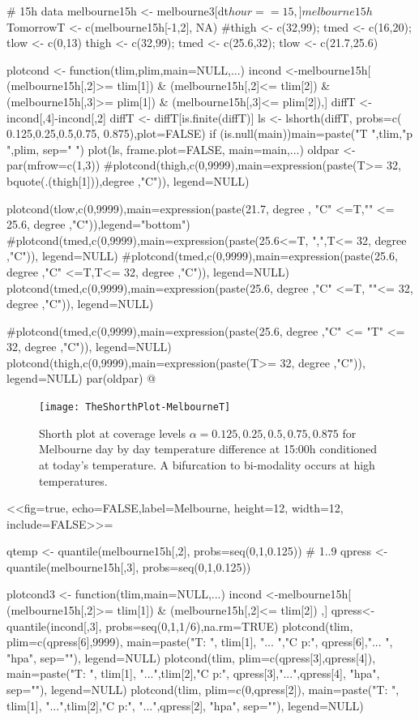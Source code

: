 \documentclass[dvips,12pt,a4paper,twoside]{amsart}
\begin{document}
# 15h data
melbourne15h <- melbourne3[dt$hour==15,]
melbourne15h$TomorrowT <- c(melbourne15h[-1,2], NA)
#thigh <- c(32,99); tmed <- c(16,20); tlow <- c(0,13)
thigh <- c(32,99); tmed <- c(25.6,32); tlow <- c(21.7,25.6)

plotcond <- function(tlim,plim,main=NULL,...){
	incond <-melbourne15h[
	(melbourne15h[,2]>= tlim[1]) 	&
	(melbourne15h[,2]<= tlim[2]) 	& 
	(melbourne15h[,3]>= plim[1]) &
	(melbourne15h[,3]<= plim[2]),]
	diffT <- incond[,4]-incond[,2]
	diffT <- diffT[is.finite(diffT)]
	ls <- lshorth(diffT, probs=c( 0.125,0.25,0.5,0.75, 	0.875),plot=FALSE)
	if (is.null(main)){main=paste("T ",tlim,"p ",plim, sep=" ")}
	plot(ls, frame.plot=FALSE, main=main,...)
	}
oldpar <- par(mfrow=c(1,3))
#plotcond(thigh,c(0,9999),main=expression(paste(T>= 32,  bquote(.(thigh[1])),degree ,"C")), legend=NULL)

plotcond(tlow,c(0,9999),main=expression(paste(21.7, degree , "C" <=T,"" <= 25.6,  degree ,"C")),legend="bottom")
#plotcond(tmed,c(0,9999),main=expression(paste(25.6<=T, ",",T<= 32,  degree ,"C")), legend=NULL)
#plotcond(tmed,c(0,9999),main=expression(paste(25.6,  degree ,"C" <=T,T<= 32,  degree ,"C")), legend=NULL)
plotcond(tmed,c(0,9999),main=expression(paste(25.6,  degree ,"C" <=T, ""<= 32,  degree ,"C")), legend=NULL)

#plotcond(tmed,c(0,9999),main=expression(paste(25.6,  degree ,"C" <= "T" <= 32,  degree ,"C")), legend=NULL)
plotcond(thigh,c(0,9999),main=expression(paste(T>= 32,  degree ,"C")), legend=NULL)
par(oldpar)
@
\begin{figure}[htb]
\texttt{[image: TheShorthPlot-MelbourneT]}
\caption{Shorth plot at coverage levels $\alpha =0.125,0.25,0.5,0.75,  0.875$ for Melbourne day by day temperature difference at 15:00h conditioned at today's temperature. 
A bifurcation to bi-modality occurs at high temperatures.}\label{fig:melbournet}\end{figure}

<<fig=true, echo=FALSE,label=Melbourne, height=12, width=12, include=FALSE>>=

qtemp <- quantile(melbourne15h[,2], probs=seq(0,1,0.125)) # 1..9
qpress <- quantile(melbourne15h[,3], probs=seq(0,1,0.125))

plotcond3 <- function(tlim,main=NULL,...){
	incond <-melbourne15h[
	(melbourne15h[,2]>= tlim[1]) 	&
	(melbourne15h[,2]<= tlim[2]) ,]
	qpress<-quantile(incond[,3], probs=seq(0,1,1/6),na.rm=TRUE)
	plotcond(tlim, plim=c(qpress[6],9999), main=paste("T: ", tlim[1], "...  ","C   p:", qpress[6],"...  ", "hpa", sep=""), legend=NULL)
	plotcond(tlim, plim=c(qpress[3],qpress[4]), main=paste("T: ", tlim[1], "...",tlim[2],"C   p:", qpress[3],"...",qpress[4], "hpa", sep=""), legend=NULL)
	plotcond(tlim, plim=c(0,qpress[2]), main=paste("T: ", tlim[1], "...",tlim[2],"C   p:", "...",qpress[2], "hpa", sep=""), legend=NULL)
	}
\end{document}
